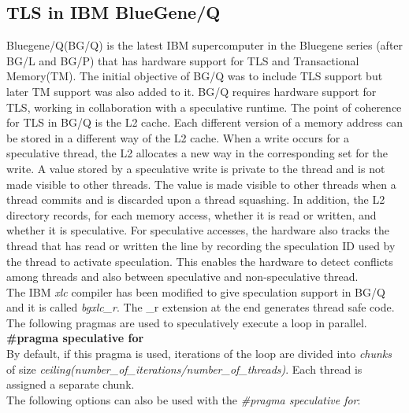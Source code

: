 \documentclass[10pt]{report}          %
\begin{document}
\subsection{TLS in IBM BlueGene/Q}

Bluegene/Q(BG/Q) is the latest IBM supercomputer in the Bluegene series (after BG/L and BG/P) that has hardware support for TLS and Transactional Memory(TM).  The initial objective of BG/Q was to include TLS support but later TM support was also added to it.  BG/Q requires hardware support for TLS, working in collaboration with a speculative runtime. The point of coherence for TLS in BG/Q is the L2 cache.  Each different version of a memory address can be stored in a different way of the L2 cache. When a write occurs for a speculative thread, the L2 allocates a new way in the corresponding set for the write. A value stored by a speculative write is private to the thread and is not made visible to other threads. The value is made visible to other threads when a thread commits and is discarded upon a thread squashing. In addition, the L2 directory records, for each memory access, whether it is read or written, and whether it is speculative. For speculative accesses, the hardware also tracks the thread that has read or written the line by recording the speculation ID used by the thread to activate speculation. This enables the hardware to detect conflicts among threads and also between speculative and non-speculative thread. \\
The IBM \textit{xlc} compiler has been modified to give speculation support in BG/Q and it is called \textit{bgxlc\_r}.  The \_r extension at the end generates thread safe code.  The following pragmas are used to speculatively execute a loop in parallel. \\
\textbf{\#pragma speculative for} \\
By default, if this pragma is used, iterations of the loop are divided into \textit{chunks} of size \textit{ceiling(number\_of\_iterations/number\_of\_threads)}. Each thread is assigned a separate chunk.\\
The following options can also be used with the \textit{\#pragma speculative for}:\\
\end{document}
